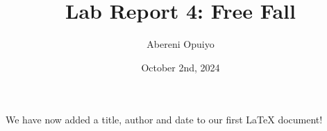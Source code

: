\documentclass[12pt, letterpaper]{article}
\title{Lab Report 4: Free Fall}
\author{Abereni Opuiyo}
\date{October 2nd, 2024}
\begin{document}
\maketitle
We have now added a title, author and date to our first \LaTeX{} document!
\end{document}
